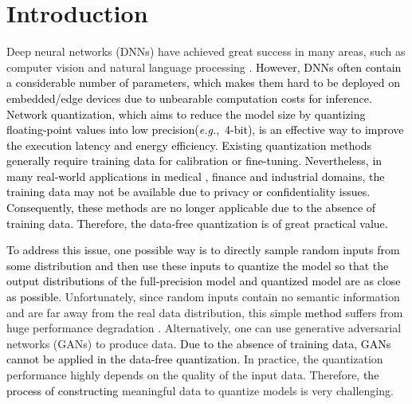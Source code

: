 \documentclass[runningheads]{llncs}
\def\eg{\emph{e.g}\onedot}
\def\eg{\mbox{\textit{e.g.}, }}
\def\kui{\textcolor{black}}
\def\new{\textcolor{black}}
\begin{document}
\section{Introduction}
\label{Introduction}
Deep neural networks (DNNs) have achieved great success in many areas, such as computer vision \cite{he2016deep,Szegedy2016inceptionv3,sandler2018mobilenetv2,guo2019nat,zeng2019graph} and  natural language processing \cite{mikolov2010recurrent,sak2014long,devlin2018bert}.
\kui{However, DNNs often contain a \new{considerable} number of parameters, which makes them hard to be deployed on embedded/edge devices due to unbearable computation \new{costs} for inference. 
Network quantization, which aims to reduce the model size by quantizing floating-point values into low precision(\eg 4-bit), is an effective way to improve the execution latency and energy efficiency.
Existing quantization methods \cite{zhou2016dorefa,choi2018pact,zhuang2018towards,zhao2019improving,lin2019defensive} generally require training data for calibration or fine-tuning. 
Nevertheless, in many real-world applications in medical \cite{zhang2019whole}, finance \cite{zhang2018adaptive} and industrial domains, the training data may not be available due to privacy or confidentiality issues.
Consequently, these methods are no longer applicable due to the absence of training data. Therefore, the data-free quantization is of great practical value.}



\kui{To address this \new{issue}, one possible way is to directly sample random inputs from some distribution and then use \new{these inputs} to quantize the model so that the output distributions of the full-precision model and quantized model are as close as possible.}
Unfortunately, since random inputs contain no semantic information and are far away from the real data distribution, this simple \new{method} suffers from huge performance degradation .
Alternatively, one can use generative adversarial networks (GANs) to produce data.
\new{Due to the absence of training data, GANs cannot be applied in the data-free quantization.}
In practice, the quantization performance highly depends on the quality of the input data.
Therefore, \new{the process of constructing} meaningful data to quantize models is very challenging.
\end{document}
